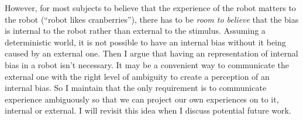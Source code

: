 However, for most subjects to believe that the experience of the robot matters to the robot (``robot likes cranberries''), there has to be \emph{room to believe} that the bias is internal to the robot rather than external to the stimulus. Assuming a deterministic world, it is not possible to have an internal bias without it being caused by an external one. Then I argue that having an representation of internal bias in a robot isn't necessary. It may be a convenient way to communicate the external one with the right level of ambiguity to create a perception of an internal bias. So I maintain that the only requirement is to communicate experience ambiguously so that we can project our own experiences on to it, internal or external. I will revisit this idea when I discuss potential future work. 

% 
